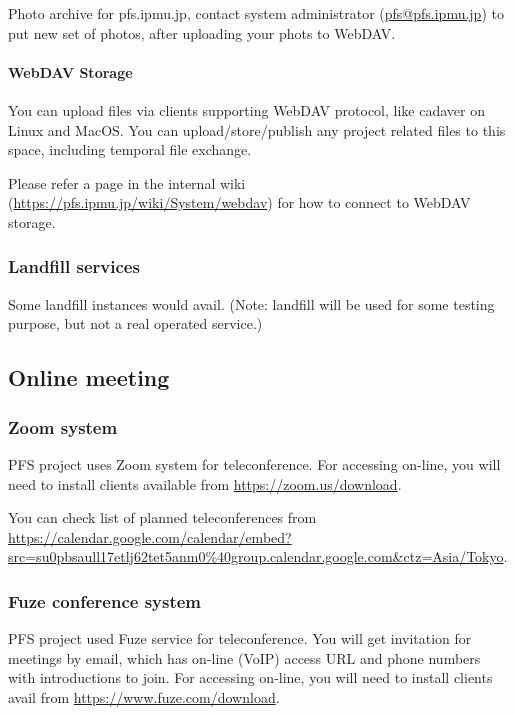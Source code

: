 \documentclass[a4paper,notitlepage]{article}
\begin{document}
Photo archive for pfs.ipmu.jp, 
contact system administrator (\url{pfs@pfs.ipmu.jp}) to put new 
set of photos, after uploading your phots to WebDAV. 


\paragraph{WebDAV Storage}
\label{sec:pfs-webdav}

You can upload files via clients supporting WebDAV protocol, like cadaver on 
Linux and MacOS. 
You can upload/store/publish any project related files to this space, 
including temporal file exchange. 

Please refer a page in the internal wiki (\url{https://pfs.ipmu.jp/wiki/System/webdav}) 
for how to connect to WebDAV storage.

\subsubsection{Landfill services}

Some landfill instances would avail. 
(Note: landfill will be used for some testing purpose, but not a real 
operated service.) 


\subsection{Online meeting}

\subsubsection{Zoom system}

PFS project uses Zoom system for teleconference. 
For accessing on-line, you will need to install clients available from 
\url{https://zoom.us/download}. 

You can check list of planned teleconferences from 
\url{https://calendar.google.com/calendar/embed?src=su0pbsaull17etlj62tet5anm0%40group.calendar.google.com&ctz=Asia/Tokyo}.


\subsubsection{Fuze conference system}
\label{sec:pfs-fuze}

PFS project used Fuze service for teleconference. 
You will get invitation for meetings by email, which has on-line (VoIP) 
access URL and phone numbers with introductions to join. 
For accessing on-line, you will need to install clients avail from 
\url{https://www.fuze.com/download}. 
\end{document}
